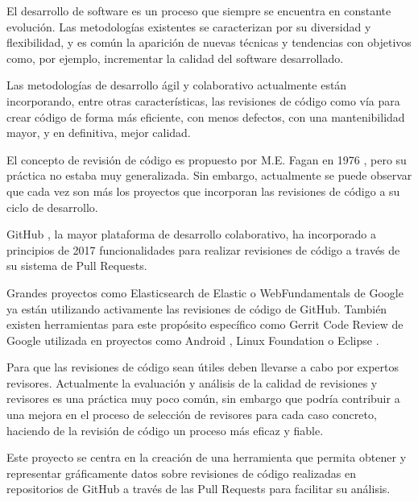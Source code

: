 
El desarrollo de software es un proceso que siempre se encuentra en constante evolución. Las metodologías existentes se caracterizan por su diversidad y flexibilidad, y es común la aparición de nuevas técnicas y tendencias con objetivos como, por ejemplo, incrementar la calidad del software desarrollado.

Las metodologías de desarrollo ágil y colaborativo actualmente están incorporando, entre otras características, las revisiones de código como vía para crear código de forma más eficiente, con menos defectos, con una mantenibilidad mayor, y en definitiva, mejor calidad.

El concepto de revisión de código es propuesto por M.E. Fagan en 1976 \cite{5388086}, pero su práctica no estaba muy generalizada. Sin embargo, actualmente se puede observar que cada vez son más los proyectos que incorporan las revisiones de código a su ciclo de desarrollo.

GitHub \cite{github:home}, la mayor plataforma de desarrollo colaborativo, ha incorporado a principios de 2017 funcionalidades para realizar revisiones de código a través de su sistema de Pull Requests.


Grandes proyectos como Elasticsearch \cite{elastic:elasticsearch} de Elastic o WebFundamentals \cite{google:webfundamentals} de Google ya están utilizando activamente las revisiones de código de GitHub. También existen herramientas para este propósito específico como Gerrit Code Review \cite{gerrit:home} de Google utilizada en proyectos como Android \cite{android:home}, Linux Foundation \cite{linuxfoundation:home} o Eclipse \cite{eclipse:home}.

Para que las revisiones de código sean útiles deben llevarse a cabo por expertos revisores. Actualmente la evaluación y análisis de la calidad de revisiones y revisores es una práctica muy poco común, sin embargo que podría contribuir a una mejora en el proceso de selección de revisores para cada caso concreto, haciendo de la revisión de código un proceso más eficaz y fiable.


Este proyecto se centra en la creación de una herramienta que permita obtener y representar gráficamente datos sobre revisiones de código realizadas en repositorios de GitHub a través de las Pull Requests para facilitar su análisis.


